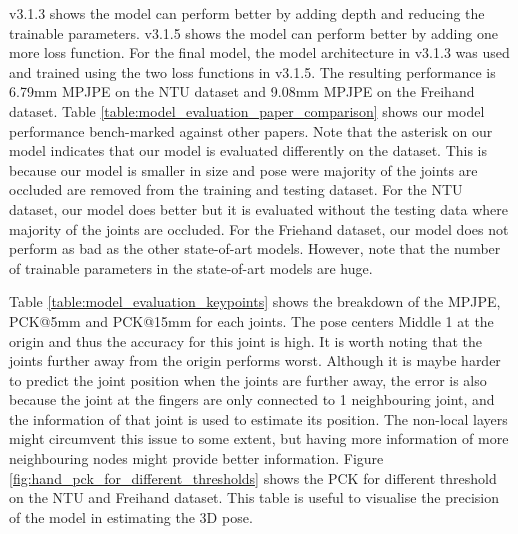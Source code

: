 \noindent
v3.1.3 shows the model can perform better by adding depth and reducing the trainable parameters. v3.1.5 shows the model can perform better by adding one more loss function. For the final model, the model architecture in v3.1.3 was used and trained using the two loss functions in v3.1.5. The resulting performance is 6.79mm MPJPE on the NTU dataset and 9.08mm MPJPE on the Freihand dataset. Table \ref{table:model_evaluation_paper_comparison} shows our model performance bench-marked against other papers. Note that the asterisk on our model indicates that our model is evaluated differently on the dataset. This is because our model is smaller in size and pose were majority of the joints are occluded are removed from the training and testing dataset. For the NTU dataset, our model does better but it is evaluated without the testing data where majority of the joints are occluded. For the Friehand dataset, our model does not perform as bad as the other state-of-art models. However, note that the number of trainable parameters in the state-of-art models are huge.

\noindent
Table \ref{table:model_evaluation_keypoints} shows the breakdown of the MPJPE, PCK@5mm and PCK@15mm for each joints. The pose centers Middle 1 at the origin and thus the accuracy for this joint is high. It is worth noting that the joints further away from the origin performs worst. Although it is maybe harder to predict the joint position when the joints are further away, the error is also because the joint at the fingers are only connected to 1 neighbouring joint, and the information of that joint is used to estimate its position. The non-local layers might circumvent this issue to some extent, but having more information of more neighbouring nodes might provide better information. Figure \ref{fig:hand_pck_for_different_thresholds} shows the PCK for different threshold on the NTU and Freihand dataset. This table is useful to visualise the precision of the model in estimating the 3D pose.

